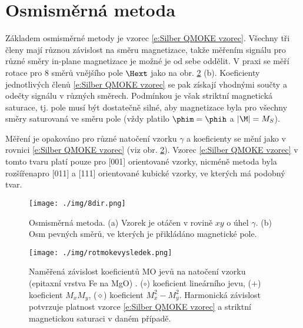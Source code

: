 \section{Osmisměrná metoda}
Základem osmisměrné metody\cite{osmismerna} je vzorec \eqref{e:Silber QMOKE vzorec}.
Všechny tři členy mají různou závislost na směru magnetizace, takže měřením signálu pro různé směry in-plane magnetizace je možné je od sebe oddělit.
V praxi se měří rotace pro 8 směrů vnějšího pole $\Hext$ jako na obr. \ref{f:osmismerna} (b).
Koeficienty jednotlivých členů \eqref{e:Silber QMOKE vzorec} se pak získají vhodnými součty a odečty signálu v různých směrech.
Podmínkou je však striktní magnetická saturace, tj. pole musí být dostatečně silné, aby magnetizace byla pro všechny směry saturovaná ve směru pole (vždy platilo $\phim=\phih$ a $|\M|=M_S$).

Měření je opakováno pro různé natočení vzorku $\gamma$ a koeficienty se mění jako v rovnici \eqref{e:Silber QMOKE vzorec} (viz obr. \ref{f:osmismerna}).
Vzorec \eqref{e:Silber QMOKE vzorec} v tomto tvaru platí pouze pro [001] orientované vzorky, nicméně metoda byla rozšířena\cita[Silber] pro [011] a [111] orientované kubické vzorky, ve kterých má podobný tvar\cite{Hamrlova}.
\begin{figure}\center
\texttt{[image: ./img/8dir.png]}
\caption{Osmisměrná metoda\cite{osmismerna}. (a) Vzorek je otáčen v rovině $xy$ o úhel $\gamma$. (b) Osm pevných směrů, ve kterých je přikládáno magnetické pole.}\label{f:osmismerna}
\end{figure}

\begin{figure}\center
\texttt{[image: ./img/rotmokevysledek.png]}
\caption{Naměřená závislost koeficientů MO jevů na natočení vzorku (epitaxní vrstva Fe na MgO) \cite{osmismerna}. ($\circ$) koeficient lineárního jevu, ($+$) koeficient $M_xM_y$, ($\diamond$) koeficient $M_x^2-M_y^2$. Harmonická závislost potvrzuje platnost vzorce \eqref{e:Silber QMOKE vzorec} a striktní magnetickou saturaci v daném případě.}\label{f:osmismerna}
\end{figure}
